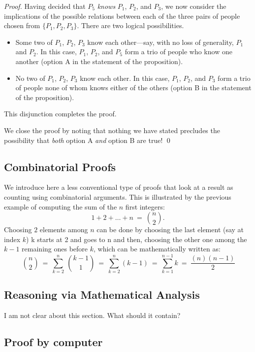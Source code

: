 \begin{proof}
Having decided that $P_5$ {\em knows} $P_1$, $P_2$, and $P_3$, we now
consider the implications of the possible relations between each of
the three pairs of people chosen from $\{P_1, P_2, P_3\}$.  There
are two logical possibilities.
\begin{itemize}
\item
Some two of $P_1$, $P_2$, $P_3$ know each other---say, with no loss of
generality, $P_1$ and $P_2$.  In this case, $P_1$, $P_2$, and $P_5$
form a trio of people who know one another (option A in the statement
of the proposition).
\item
No two of $P_1$, $P_2$, $P_3$ know each other.  In this case, $P_1$,
$P_2$, and $P_3$ form a trio of people none of whom knows either of
the others (option B in the statement of the proposition).
\end{itemize}
This disjunction completes the proof.

We close the proof by noting that nothing we have stated precludes the
possibility that {\em both} option A {\em and} option B are true!  \qed
\end{proof}


\subsection{Combinatorial Proofs}

We introduce here a less conventional type of proofs that look at a result
as counting using combinatorial arguments.
This is illustrated by the previous example of computing the sum of the $n$ first integers:
\[ 1+2+ \ldots + n \ = \ {n \choose 2}.  \]
Choosing $2$ elements among $n$ can be done by choosing the last element (say at index $k$)
{\Denis k starts at 2 and goes to n}
and then, choosing the other one among the $k-1$ remaining ones before $k$, 
which can be mathematically written as:
\[ \ {n \choose 2} \ = \  \sum_{k=2}^n  \ {k-1 \choose 1} \ = \  \sum_{k=2}^n  (k-1) \ = \  \sum_{k=1}^{n-1}  k \ = \ \frac{(n)(n-1)}{2}\]


\subsection{Reasoning via Mathematical Analysis}
\label{sec:analysis}

{\Denis I am not clear about this section.
What should it contain?}


\subsection{Proof by computer}

